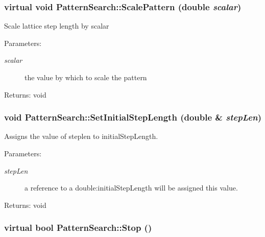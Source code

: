 \subsubsection{\setlength{\rightskip}{0pt plus 5cm}virtual void Pattern\-Search::Scale\-Pattern (double {\em scalar})\hspace{0.3cm}{\tt  [protected, virtual]}}\label{classPatternSearch_b5}


Scale lattice step length by scalar \begin{Desc}
\item[Parameters:]
\begin{description}
\item[{\em scalar}]the value by which to scale the pattern \end{description}
\end{Desc}
\begin{Desc}
\item[Returns:]void \end{Desc}
\subsubsection{\setlength{\rightskip}{0pt plus 5cm}void Pattern\-Search::Set\-Initial\-Step\-Length (double \& {\em step\-Len})}\label{classPatternSearch_z21_3}


Assigns the value of steplen to initial\-Step\-Length. \begin{Desc}
\item[Parameters:]
\begin{description}
\item[{\em step\-Len}]a reference to a double:initial\-Step\-Length will be assigned this value. \end{description}
\end{Desc}
\begin{Desc}
\item[Returns:]void \end{Desc}
\subsubsection{\setlength{\rightskip}{0pt plus 5cm}virtual bool Pattern\-Search::Stop ()\hspace{0.3cm}{\tt  [protected, virtual]}}\label{classPatternSearch_b0}


